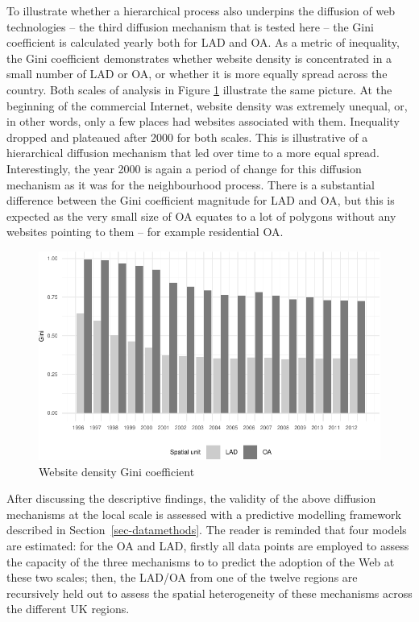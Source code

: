 \documentclass[
  authoryear,
  preprint,
  3p]{elsarticle}
\begin{document}
To illustrate whether a hierarchical process also underpins the
diffusion of web technologies -- the third diffusion mechanism that is
tested here -- the Gini coefficient is calculated yearly both for LAD
and OA. As a metric of inequality, the Gini coefficient demonstrates
whether website density is concentrated in a small number of LAD or OA,
or whether it is more equally spread across the country. Both scales of
analysis in Figure \ref{gini} illustrate the same picture. At the
beginning of the commercial Internet, website density was extremely
unequal, or, in other words, only a few places had websites associated
with them. Inequality dropped and plateaued after 2000 for both scales.
This is illustrative of a hierarchical diffusion mechanism that led over
time to a more equal spread. Interestingly, the year 2000 is again a
period of change for this diffusion mechanism as it was for the
neighbourhood process. There is a substantial difference between the
Gini coefficient magnitude for LAD and OA, but this is expected as the
very small size of OA equates to a lot of polygons without any websites
pointing to them -- for example residential OA.

\begin{figure}[H]

{\centering \includegraphics[width=1\textwidth,height=\textheight]{anonymised_files/figure-pdf/gini-1.pdf}

}

\caption{\label{gini}Website density Gini coefficient}

\end{figure}%

After discussing the descriptive findings, the validity of the above
diffusion mechanisms at the local scale is assessed with a predictive
modelling framework described in Section~\ref{sec-datamethods}. The
reader is reminded that four models are estimated: for the OA and LAD,
firstly all data points are employed to assess the capacity of the three
mechanisms to to predict the adoption of the Web at these two scales;
then, the LAD/OA from one of the twelve regions are recursively held out
to assess the spatial heterogeneity of these mechanisms across the
different UK regions.
\end{document}
